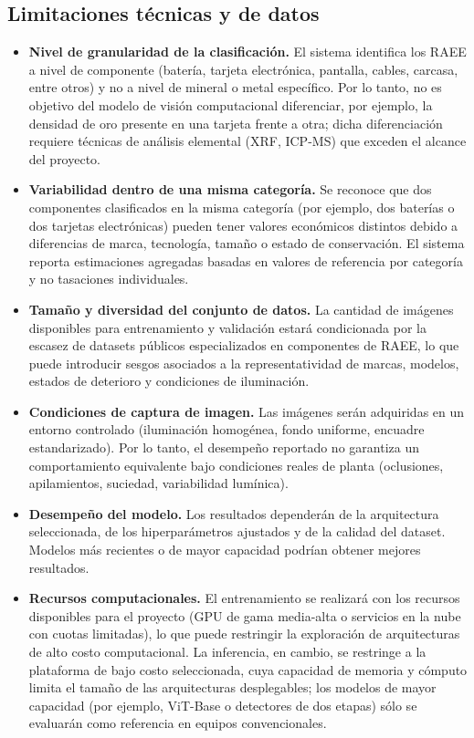\subsection{Limitaciones técnicas y de datos}
\begin{itemize}
    \item \textbf{Nivel de granularidad de la clasificación.} El sistema identifica los RAEE a nivel de componente (batería, tarjeta electrónica, pantalla, cables, carcasa, entre otros) y no a nivel de mineral o metal específico. Por lo tanto, no es objetivo del modelo de visión computacional diferenciar, por ejemplo, la densidad de oro presente en una tarjeta frente a otra; dicha diferenciación requiere técnicas de análisis elemental (XRF, ICP-MS) que exceden el alcance del proyecto.
    \item \textbf{Variabilidad dentro de una misma categoría.} Se reconoce que dos componentes clasificados en la misma categoría (por ejemplo, dos baterías o dos tarjetas electrónicas) pueden tener valores económicos distintos debido a diferencias de marca, tecnología, tamaño o estado de conservación. El sistema reporta estimaciones agregadas basadas en valores de referencia por categoría y no tasaciones individuales.
    \item \textbf{Tamaño y diversidad del conjunto de datos.} La cantidad de imágenes disponibles para entrenamiento y validación estará condicionada por la escasez de datasets públicos especializados en componentes de RAEE, lo que puede introducir sesgos asociados a la representatividad de marcas, modelos, estados de deterioro y condiciones de iluminación.
    \item \textbf{Condiciones de captura de imagen.} Las imágenes serán adquiridas en un entorno controlado (iluminación homogénea, fondo uniforme, encuadre estandarizado). Por lo tanto, el desempeño reportado no garantiza un comportamiento equivalente bajo condiciones reales de planta (oclusiones, apilamientos, suciedad, variabilidad lumínica).
    \item \textbf{Desempeño del modelo.} Los resultados dependerán de la arquitectura seleccionada, de los hiperparámetros ajustados y de la calidad del dataset. Modelos más recientes o de mayor capacidad podrían obtener mejores resultados.
    \item \textbf{Recursos computacionales.} El entrenamiento se realizará con los recursos disponibles para el proyecto (GPU de gama media-alta o servicios en la nube con cuotas limitadas), lo que puede restringir la exploración de arquitecturas de alto costo computacional. La inferencia, en cambio, se restringe a la plataforma de bajo costo seleccionada, cuya capacidad de memoria y cómputo limita el tamaño de las arquitecturas desplegables; los modelos de mayor capacidad (por ejemplo, ViT-Base o detectores de dos etapas) sólo se evaluarán como referencia en equipos convencionales.

\end{itemize}
